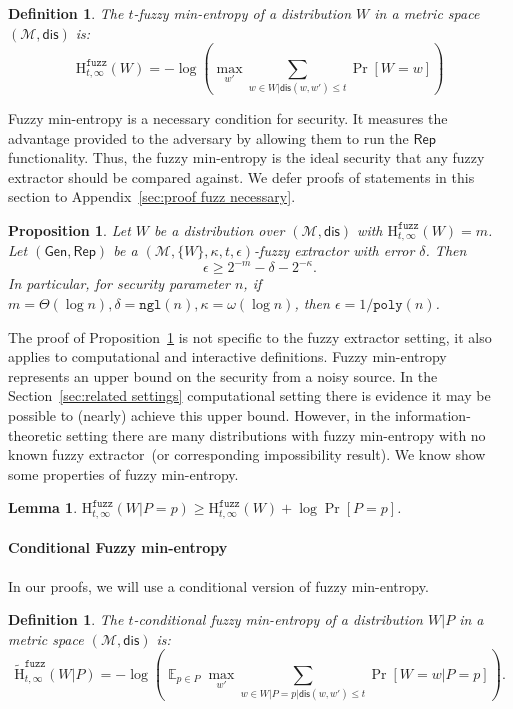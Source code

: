 \documentclass[11pt]{article}
\newcommand{\secref}[1]{\mbox{Section~\ref{#1}}}
\newcommand{\apref}[1]{\mbox{Appendix~\ref{#1}}}
\newcommand{\lemref}[1]{\mbox{Lemma~\ref{#1}}}
\newcommand{\propref}[1]{\mbox{Proposition~\ref{#1}}}
\DeclareMathOperator*{\expe}{\mathbb{E}}
\newcommand{\class}[1]{{\ensuremath{\mathsf{#1}}}}
\newcommand{\gen}{\ensuremath{\class{Gen}}\xspace}
\newcommand{\rep}{\ensuremath{\class{Rep}}\xspace}
\newcommand{\dis}{\ensuremath{\mathsf{dis}}}
\newcommand{\poly}{\ensuremath{\mathtt{poly}}\xspace}
\newcommand{\ngl}{\ensuremath{\mathtt{ngl}}\xspace}
\newcommand{\Hfuzz}{\mathrm{H}^{\mathtt{fuzz}}_{t,\infty}}
\newcommand{\Hfav}{\tilde{\mathrm{H}}^{\mathtt{fuzz}}_{t,\infty}}
\newtheorem{lemma}[theorem]{Lemma}
\newtheorem{proposition}[theorem]{Proposition}
\newtheorem{definition}[theorem]{Definition}
\begin{document}
\begin{definition}
\label{def:fuzzy min-ent}
The $t$-fuzzy min-entropy of a distribution $W$ in a metric space $(\mathcal{M}, \dis)$ is:
\[
\Hfuzz(W) = -\log \left(\max_{w'}  \sum_{w\in W | \dis(w, w')\le t} \Pr[W=w] \right)
\]
\end{definition}
\noindent
Fuzzy min-entropy is a necessary condition for security.  It measures the advantage provided to the adversary by allowing them to run the $\rep$ functionality.  Thus, the fuzzy min-entropy is the ideal security that any fuzzy extractor should be compared against.  We defer proofs of statements in this section to \apref{sec:proof fuzz necessary}.
\begin{proposition}
\label{prop:fuzz necessary}
Let $W$ be a distribution  over $(\mathcal{M}, \dis)$ with $\Hfuzz(W) =m$.  Let $(\gen, \rep)$ be a $(\mathcal{M}, \{W\}, \kappa, t, \epsilon)$-fuzzy extractor with error $\delta$.  Then 
\[
\epsilon\ge 2^{-m}-\delta -2^{-\kappa}.
\]
In particular, for security parameter $n$, if $m = \Theta(\log n), \delta = \ngl(n), \kappa = \omega(\log n)$, then $\epsilon  = 1/\poly(n)$.
\end{proposition}

The proof of \propref{prop:fuzz necessary} is not specific to the fuzzy extractor setting, it also applies to computational and interactive definitions.  Fuzzy min-entropy represents an upper bound on the security from a noisy source.  In the \secref{sec:related settings} computational setting there is evidence it may be possible to (nearly) achieve this upper bound.  However, in the information-theoretic setting there are many distributions with fuzzy min-entropy with no known fuzzy extractor~(or corresponding impossibility result).  We know show some properties of fuzzy min-entropy.
\begin{lemma}
\label{lem:conditional fuzz rule}
$\Hfuzz(W|P=p) \ge \Hfuzz(W) + \log \Pr[P=p]$.
\end{lemma}

\paragraph{Conditional Fuzzy min-entropy}
In our proofs, we will use a conditional version of fuzzy min-entropy.
\begin{definition}
\label{def:cond fuzzy ent}
The $t$-conditional fuzzy min-entropy of a distribution $W |P$ in a metric space $(\mathcal{M}, \dis)$ is:
\[
\Hfav(W|P) = -\log \left( \expe_{p\in P} \max_{w'} \sum_{w\in W |P =p | \dis(w, w')\le t} \Pr[W=w|P=p]\right).
\]
\end{definition}
\end{document}
